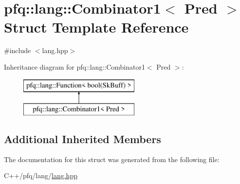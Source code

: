 \hypertarget{structpfq_1_1lang_1_1Combinator1}{\section{pfq\+:\+:lang\+:\+:Combinator1$<$ Pred $>$ Struct Template Reference}
\label{structpfq_1_1lang_1_1Combinator1}
}


{\ttfamily \#include $<$lang.\+hpp$>$}

Inheritance diagram for pfq\+:\+:lang\+:\+:Combinator1$<$ Pred $>$\+:\begin{figure}[H]
\begin{center}
\leavevmode
\includegraphics[height=2.000000cm]{structpfq_1_1lang_1_1Combinator1}
\end{center}
\end{figure}
\subsection*{Additional Inherited Members}


The documentation for this struct was generated from the following file\+:\begin{DoxyCompactItemize}
\item 
C++/pfq/lang/\hyperlink{lang_8hpp}{lang.\+hpp}\end{DoxyCompactItemize}
